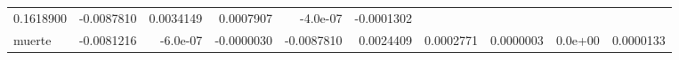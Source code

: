 \documentclass[]{article}
\begin{document}
\begin{longtable}[]{@{}lrrrrrrrrr@{}}
\begin{minipage}[t]{0.09\columnwidth}
0.1618900\strut
\end{minipage} & \begin{minipage}[t]{0.07\columnwidth}\raggedleft\strut
-0.0087810\strut
\end{minipage} & \begin{minipage}[t]{0.07\columnwidth}\raggedleft\strut
0.0034149\strut
\end{minipage} & \begin{minipage}[t]{0.07\columnwidth}\raggedleft\strut
0.0007907\strut
\end{minipage} & \begin{minipage}[t]{0.06\columnwidth}\raggedleft\strut
-4.0e-07\strut
\end{minipage} & \begin{minipage}[t]{0.09\columnwidth}\raggedleft\strut
-0.0001302\strut
\end{minipage}\tabularnewline
\begin{minipage}[t]{0.09\columnwidth}\raggedright\strut
muerte\strut
\end{minipage} & \begin{minipage}[t]{0.07\columnwidth}\raggedleft\strut
-0.0081216\strut
\end{minipage} & \begin{minipage}[t]{0.07\columnwidth}\raggedleft\strut
-6.0e-07\strut
\end{minipage} & \begin{minipage}[t]{0.07\columnwidth}\raggedleft\strut
-0.0000030\strut
\end{minipage} & \begin{minipage}[t]{0.09\columnwidth}\raggedleft\strut
-0.0087810\strut
\end{minipage} & \begin{minipage}[t]{0.07\columnwidth}\raggedleft\strut
0.0024409\strut
\end{minipage} & \begin{minipage}[t]{0.07\columnwidth}\raggedleft\strut
0.0002771\strut
\end{minipage} & \begin{minipage}[t]{0.07\columnwidth}\raggedleft\strut
0.0000003\strut
\end{minipage} & \begin{minipage}[t]{0.06\columnwidth}\raggedleft\strut
0.0e+00\strut
\end{minipage} & \begin{minipage}[t]{0.09\columnwidth}\raggedleft\strut
0.0000133\strut
\end{minipage}\tabularnewline

\end{longtable}
\end{document}
